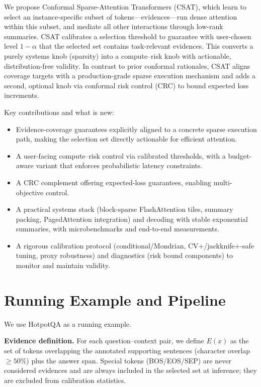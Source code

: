\documentclass[11pt]{article}
\begin{document}
We propose Conformal Sparse-Attention Transformers (CSAT), which learn to select an instance-specific subset of tokens---evidences---run dense attention within this subset, and mediate all other interactions through low-rank summaries. CSAT calibrates a selection threshold to guarantee with user-chosen level $1-\alpha$ that the selected set contains task-relevant evidences. This converts a purely systems knob (sparsity) into a compute--risk knob with actionable, distribution-free validity. In contrast to prior conformal rationales, CSAT aligns coverage targets with a production-grade sparse execution mechanism and adds a second, optional knob via conformal risk control (CRC) to bound expected loss increments.

Key contributions and what is new:
\begin{itemize}
\item Evidence-coverage guarantees explicitly aligned to a concrete sparse execution path, making the selection set directly actionable for efficient attention.
\item A user-facing compute--risk control via calibrated thresholds, with a budget-aware variant that enforces probabilistic latency constraints.
\item A CRC complement offering expected-loss guarantees, enabling multi-objective control.
\item A practical systems stack (block-sparse FlashAttention tiles, summary packing, PagedAttention integration) and decoding with stable exponential summaries, with microbenchmarks and end-to-end measurements.
\item A rigorous calibration protocol (conditional/Mondrian, CV+/jackknife+-safe tuning, proxy robustness) and diagnostics (risk bound components) to monitor and maintain validity.
\end{itemize}

\section{Running Example and Pipeline}
We use HotpotQA as a running example.

\textbf{Evidence definition.} For each question--context pair, we define $E(x)$ as the set of tokens overlapping the annotated supporting sentences (character overlap $\geq 50\%$) plus the answer span. Special tokens (BOS/EOS/SEP) are never considered evidences and are always included in the selected set at inference; they are excluded from calibration statistics.
\end{document}
